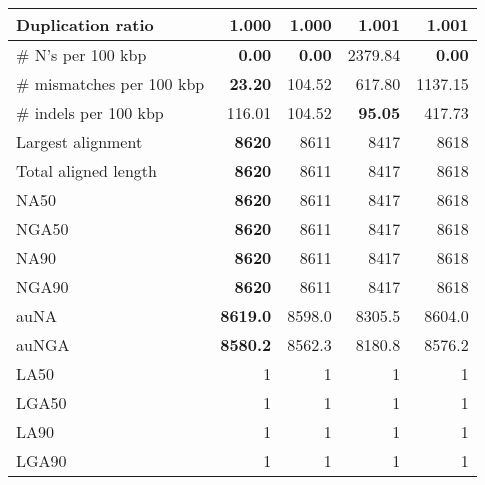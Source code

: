 \documentclass[12pt,a4paper]{article}
\begin{document}
\begin{table}[ht]
\begin{center}
\begin{tabular}{|l*{4}{|r}|}
Duplication ratio & {\bf 1.000} & {\bf 1.000} & 1.001 & 1.001 \\ \hline
\# N's per 100 kbp & {\bf 0.00} & {\bf 0.00} & 2379.84 & {\bf 0.00} \\ \hline
\# mismatches per 100 kbp & {\bf 23.20} & 104.52 & 617.80 & 1137.15 \\ \hline
\# indels per 100 kbp & 116.01 & 104.52 & {\bf 95.05} & 417.73 \\ \hline
Largest alignment & {\bf 8620} & 8611 & 8417 & 8618 \\ \hline
Total aligned length & {\bf 8620} & 8611 & 8417 & 8618 \\ \hline
NA50 & {\bf 8620} & 8611 & 8417 & 8618 \\ \hline
NGA50 & {\bf 8620} & 8611 & 8417 & 8618 \\ \hline
NA90 & {\bf 8620} & 8611 & 8417 & 8618 \\ \hline
NGA90 & {\bf 8620} & 8611 & 8417 & 8618 \\ \hline
auNA & {\bf 8619.0} & 8598.0 & 8305.5 & 8604.0 \\ \hline
auNGA & {\bf 8580.2} & 8562.3 & 8180.8 & 8576.2 \\ \hline
LA50 & 1 & 1 & 1 & 1 \\ \hline
LGA50 & 1 & 1 & 1 & 1 \\ \hline
LA90 & 1 & 1 & 1 & 1 \\ \hline
LGA90 & 1 & 1 & 1 & 1 \\ \hline
\end{tabular}
\end{center}
\end{table}
\end{document}
